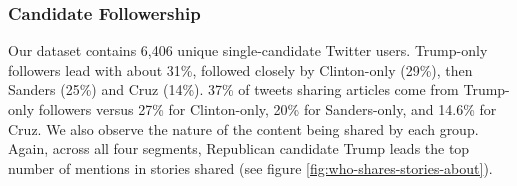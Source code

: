 \documentclass[letterpaper]{article}
\begin{document}
\subsubsection{Candidate Followership}
Our dataset contains 6,406 unique single-candidate Twitter users. Trump-only followers lead with about 31\%, followed closely by Clinton-only (29\%), then Sanders (25\%) and Cruz (14\%). 37\% of tweets sharing articles come from Trump-only followers versus 27\% for Clinton-only, 20\% for Sanders-only, and 14.6\% for Cruz. We also observe the nature of the content being shared by each group. Again, across all four segments, Republican candidate Trump leads the top number of mentions in stories shared (see figure \ref{fig:who-shares-stories-about}).



\end{document}
